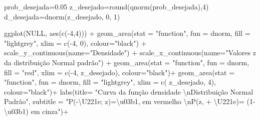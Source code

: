 \documentclass[
]{book}
\newenvironment{Shaded}{\begin{snugshade}}{\end{snugshade}}
\newcommand{\AttributeTok}[1]{\textcolor[rgb]{0.77,0.63,0.00}{#1}}
\newcommand{\ConstantTok}[1]{\textcolor[rgb]{0.00,0.00,0.00}{#1}}
\newcommand{\DecValTok}[1]{\textcolor[rgb]{0.00,0.00,0.81}{#1}}
\newcommand{\FloatTok}[1]{\textcolor[rgb]{0.00,0.00,0.81}{#1}}
\newcommand{\FunctionTok}[1]{\textcolor[rgb]{0.00,0.00,0.00}{#1}}
\newcommand{\NormalTok}[1]{#1}
\newcommand{\OtherTok}[1]{\textcolor[rgb]{0.56,0.35,0.01}{#1}}
\newcommand{\SpecialCharTok}[1]{\textcolor[rgb]{0.00,0.00,0.00}{#1}}
\newcommand{\StringTok}[1]{\textcolor[rgb]{0.31,0.60,0.02}{#1}}
\begin{document}
\begin{Shaded}
\begin{Highlighting}[]
\NormalTok{prob\_desejada}\OtherTok{=}\FloatTok{0.05}
\NormalTok{z\_desejado}\OtherTok{=}\FunctionTok{round}\NormalTok{(}\FunctionTok{qnorm}\NormalTok{(prob\_desejada),}\DecValTok{4}\NormalTok{)}
\NormalTok{d\_desejada}\OtherTok{=}\FunctionTok{dnorm}\NormalTok{(z\_desejado, }\DecValTok{0}\NormalTok{, }\DecValTok{1}\NormalTok{)}

\FunctionTok{ggplot}\NormalTok{(}\ConstantTok{NULL}\NormalTok{, }\FunctionTok{aes}\NormalTok{(}\FunctionTok{c}\NormalTok{(}\SpecialCharTok{{-}}\DecValTok{4}\NormalTok{,}\DecValTok{4}\NormalTok{))) }\SpecialCharTok{+}
  \FunctionTok{geom\_area}\NormalTok{(}\AttributeTok{stat =} \StringTok{"function"}\NormalTok{, }
            \AttributeTok{fun =}\NormalTok{ dnorm, }
            \AttributeTok{fill =} \StringTok{"lightgrey"}\NormalTok{, }
            \AttributeTok{xlim =} \FunctionTok{c}\NormalTok{(}\SpecialCharTok{{-}}\DecValTok{4}\NormalTok{, }\DecValTok{0}\NormalTok{),}
            \AttributeTok{colour=}\StringTok{"black"}\NormalTok{) }\SpecialCharTok{+}
  \FunctionTok{scale\_y\_continuous}\NormalTok{(}\AttributeTok{name=}\StringTok{"Densidade"}\NormalTok{) }\SpecialCharTok{+}
  \FunctionTok{scale\_x\_continuous}\NormalTok{(}\AttributeTok{name=}\StringTok{"Valores \textasciigrave{}\textasciigrave{}z\textquotesingle{}\textquotesingle{} da distribuição Normal padrão"}\NormalTok{)  }\SpecialCharTok{+}
  \FunctionTok{geom\_area}\NormalTok{(}\AttributeTok{stat =} \StringTok{"function"}\NormalTok{,}
            \AttributeTok{fun =}\NormalTok{ dnorm, }
            \AttributeTok{fill =} \StringTok{"red"}\NormalTok{, }
            \AttributeTok{xlim =} \FunctionTok{c}\NormalTok{(}\SpecialCharTok{{-}}\DecValTok{4}\NormalTok{, z\_desejado),}
            \AttributeTok{colour=}\StringTok{"black"}\NormalTok{)}\SpecialCharTok{+}
  \FunctionTok{geom\_area}\NormalTok{(}\AttributeTok{stat =} \StringTok{"function"}\NormalTok{,}
            \AttributeTok{fun =}\NormalTok{ dnorm, }
            \AttributeTok{fill =} \StringTok{"lightgrey"}\NormalTok{, }
            \AttributeTok{xlim =} \FunctionTok{c}\NormalTok{( z\_desejado, }\DecValTok{4}\NormalTok{),}
            \AttributeTok{colour=}\StringTok{"black"}\NormalTok{)}\SpecialCharTok{+}
  \FunctionTok{labs}\NormalTok{(}\AttributeTok{title=} 
      \StringTok{"Curva da função densidade}
\StringTok{      }\SpecialCharTok{\textbackslash{}n}\StringTok{Distribuição Normal Padrão"}\NormalTok{, }
      \AttributeTok{subtitle =} \StringTok{"P({-}\textbackslash{}U221e; z)=\textbackslash{}u03b1, em vermelho }\SpecialCharTok{\textbackslash{}n}\StringTok{P(z, + \textbackslash{}U221e)= (1{-}\textbackslash{}u03b1) em cinza"}\NormalTok{)}\SpecialCharTok{+}

\end{Highlighting}
\end{Shaded}
\end{document}
